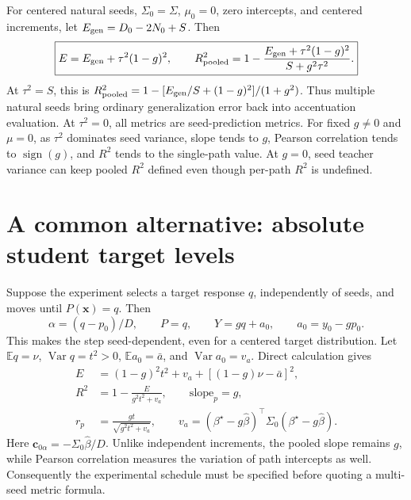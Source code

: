 \documentclass[11pt]{article}
\newcommand{\E}{\mathbb E}
\newcommand{\Var}{\operatorname{Var}}
\newcommand{\bstar}{{\beta^{\star}}}
\newcommand{\bhat}{\hat{\beta}}
\newcommand{\x}{\mathbf{x}}
\begin{document}
For centered natural seeds, $\Sigma_0=\Sigma$, $\mu_0=0$, zero intercepts,
and centered increments, let $E_{\rm gen}=D_0-2N_0+S$. Then
\begin{equation}\boxed{
 E=E_{\rm gen}+\tau^2(1-g)^2,\qquad
 R^2_{\rm pooled}=1-\frac{E_{\rm gen}+\tau^2(1-g)^2}{S+g^2\tau^2}.}
\end{equation}
At $\tau^2=S$, this is
$R^2_{\rm pooled}=1-[E_{\rm gen}/S+(1-g)^2]/(1+g^2)$.
Thus multiple natural seeds bring ordinary generalization error back into
accentuation evaluation. At $\tau^2=0$, all metrics are seed-prediction
metrics. For fixed $g\ne0$ and $\mu=0$, as $\tau^2$ dominates seed variance,
slope tends to $g$, Pearson correlation tends to $\operatorname{sign}(g)$,
and $R^2$ tends to the single-path value. At $g=0$, seed teacher variance
can keep pooled $R^2$ defined even though per-path $R^2$ is undefined.

\section{A common alternative: absolute student target levels}
Suppose the experiment selects a target response $q$, independently of seeds,
and moves until $P(\x)=q$. Then
\[
 \alpha=(q-p_0)/D,\qquad P=q,\qquad
 Y=g q+a_0,\qquad a_0=y_0-g p_0.
\]
This makes the step seed-dependent, even for a centered target distribution.
Let $\E q=\nu$, $\Var q=t^2>0$, $\E a_0=\bar a$,
and $\Var a_0=v_a$. Direct calculation gives
\begin{align}
 E&=(1-g)^2t^2+v_a+[(1-g)\nu-\bar a]^2,\\
 R^2&=1-\frac{E}{g^2t^2+v_a},\qquad \mathrm{slope}_p=g,\\
 r_p&=\frac{g t}{\sqrt{g^2t^2+v_a}},\qquad
 v_a=(\bstar-g\bhat)^\top \Sigma_0(\bstar-g\bhat).
\end{align}
Here $\bm c_{0\alpha}=-\Sigma_0\bhat/D$. Unlike independent increments, the pooled slope
remains $g$, while Pearson correlation measures the variation of path
intercepts as well. Consequently the experimental schedule must be specified
before quoting a multi-seed metric formula.
\end{document}
